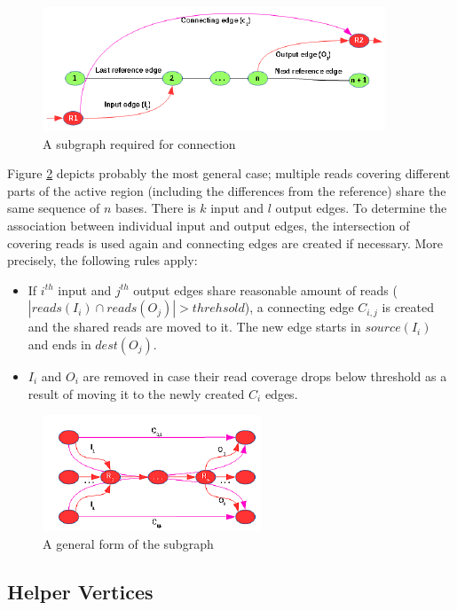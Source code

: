 \begin{figure}[h]
	\centering
	\includegraphics{img/connection-general.pdf}
	\caption{A subgraph required for connection}
	\label{fig:connection-general}
\end{figure}

Figure \ref{fig:connection-abstract} depicts probably the most general case; multiple reads covering different parts of the active region (including the differences from the reference) share the same sequence of $n$ bases. There is $k$ input and $l$ output edges. To determine the association between individual input and output edges, the intersection of covering reads is used again and connecting edges are created if necessary. More precisely, the following rules apply:
\begin{itemize}
\item If $i^{th}$ input and $j^{th}$ output edges share reasonable amount of reads ($|reads(I_i) \cap reads(O_j)| > threhsold$), a connecting edge $C_{i,j}$ is created and the shared reads are moved to it. The new edge starts in $source(I_i)$ and ends in $dest(O_j)$.
\item $I_i$ and $O_i$ are removed in case their read coverage drops below threshold as a result of moving it to the newly created $C_i$ edges. 
\end{itemize}

\begin{figure}[h]
	\centering
	\includegraphics{img/connection-abstract.pdf}
	\caption{A general form of the subgraph}
	\label{fig:connection-abstract}
\end{figure}

\subsection{Helper Vertices}
\label{subsec:helper-vertices}

